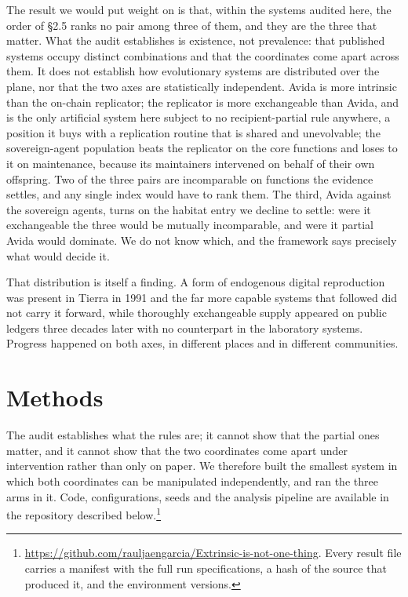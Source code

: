 \documentclass[review,3p,times]{elsarticle}
\newcommand{\repourl}{\url{https://github.com/rauljaengarcia/Extrinsic-is-not-one-thing}}
\begin{document}
The result we would put weight on is that, within the systems audited here,
the order of \S2.5 ranks no pair among three of them, and they are the three
that matter. What the audit establishes is existence, not prevalence: that
published systems occupy distinct combinations and that the coordinates come
apart across them. It does not establish how evolutionary systems are
distributed over the plane, nor that the two axes are statistically
independent. Avida
is more intrinsic than the on-chain replicator; the replicator is more
exchangeable than Avida, and is the only artificial system here subject to no
recipient-partial rule anywhere, a position it buys with a replication routine
that is shared and unevolvable; the sovereign-agent population beats the
replicator on the core functions and loses to it on maintenance, because
its maintainers intervened on behalf of their own offspring. Two of the three
pairs are incomparable on functions the evidence settles, and any single index
would have to rank them. The third, Avida against the sovereign agents, turns
on the habitat entry we decline to settle: were it exchangeable the three
would be mutually incomparable, and were it partial Avida would dominate. We
do not know which, and the framework says precisely what would decide it.

That distribution is itself a finding. A form of endogenous digital
reproduction was present in Tierra in 1991 and the far more capable systems
that followed did not carry it forward, while thoroughly exchangeable supply
appeared on public ledgers three decades later with no counterpart in the
laboratory systems. Progress happened on both axes, in different places and in
different communities.

\section{Methods}

The audit establishes what the rules are; it cannot show that the partial ones
matter, and it cannot show that the two coordinates come apart under
intervention rather than only on paper. We therefore built the smallest system
in which both coordinates can be manipulated independently, and ran the three
arms in it. Code, configurations, seeds and the analysis pipeline are
available in the repository described below.\footnote{\repourl. Every result
file carries a manifest with the full
run specifications, a hash of the source that produced it, and the environment
versions.}
\end{document}
